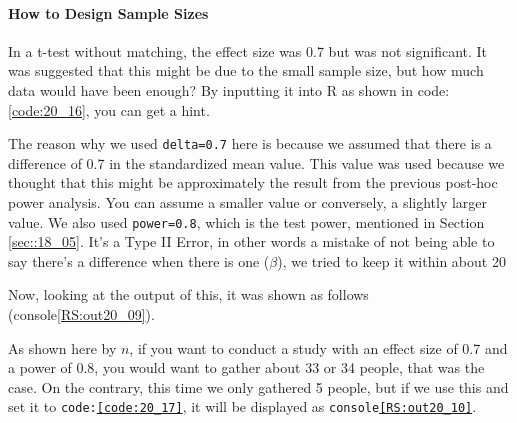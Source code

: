 \documentclass{ltjsbook}
\begin{document}
\paragraph{How to Design Sample Sizes}
In a t-test without matching, the effect size was 0.7 but was not significant. It was suggested that this might be due to the small sample size, but how much data would have been enough? By inputting it into R as shown in code:\ref{code:20_16}, you can get a hint.

The reason why we used \texttt{delta=0.7} here is because we assumed that there is a difference of 0.7 in the standardized mean value. This value was used because we thought that this might be approximately the result from the previous post-hoc power analysis. You can assume a smaller value or conversely, a slightly larger value. We also used \texttt{power=0.8}, which is the test power, mentioned in Section \ref{sec::18_05}. It's a Type II Error, in other words a mistake of not being able to say there's a difference when there is one ($\beta$), we tried to keep it within about 20%

Now, looking at the output of this, it was shown as follows (console\ref{RS:out20_09}).

As shown here by $n$, if you want to conduct a study with an effect size of 0.7 and a power of 0.8, you would want to gather about 33 or 34 people, that was the case. On the contrary, this time we only gathered 5 people, but if we use this and set it to \texttt{code:\ref{code:20_17}}, it will be displayed as \texttt{console\ref{RS:out20_10}}.
\end{document}
